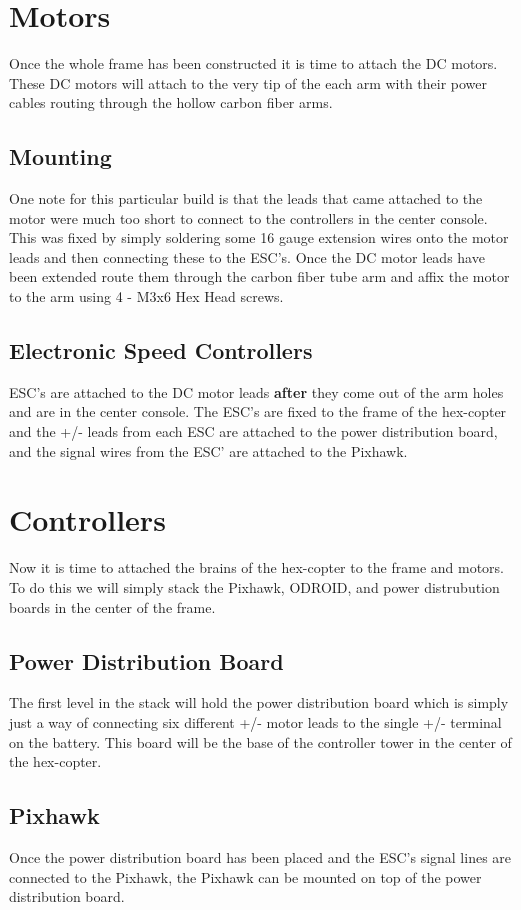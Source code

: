 \documentclass[10pt,notitlepage]{article}
\begin{document}
\section{Motors}
Once the whole frame has been constructed it is time to attach the DC motors. These DC motors will attach to the very tip of the each arm with their power cables routing through the hollow carbon fiber arms.
\subsection{Mounting}
One note for this particular build is that the leads that came attached to the motor were much too short to connect to the controllers in the center console. This was fixed by simply soldering some 16 gauge extension wires onto the motor leads and then connecting these to the ESC's. Once the DC motor leads have been extended route them through the carbon fiber tube arm and affix the motor to the arm using 4 - M3x6 Hex Head screws.
\subsection{Electronic Speed Controllers}
ESC's are attached to the DC motor leads \textbf{after} they come out of the arm holes and are in the center console. The ESC's are fixed to the frame of the hex-copter and the +/- leads from each ESC are attached to the power distribution board, and the signal wires from the ESC' are attached to the Pixhawk.

\section{Controllers}
Now it is time to attached the brains of the hex-copter to the frame and motors. To do this we will simply stack the Pixhawk, ODROID, and power distrubution boards in the center of the frame.
\subsection{Power Distribution Board}
The first level in the stack will hold the power distribution board which is simply just a way of connecting six different +/- motor leads to the single +/- terminal on the battery. This board will be the base of the controller tower in the center of the hex-copter.
\subsection{Pixhawk}
Once the power distribution board has been placed and the ESC's signal lines are connected to the Pixhawk, the Pixhawk can be mounted on top of the power distribution board.
\end{document}
